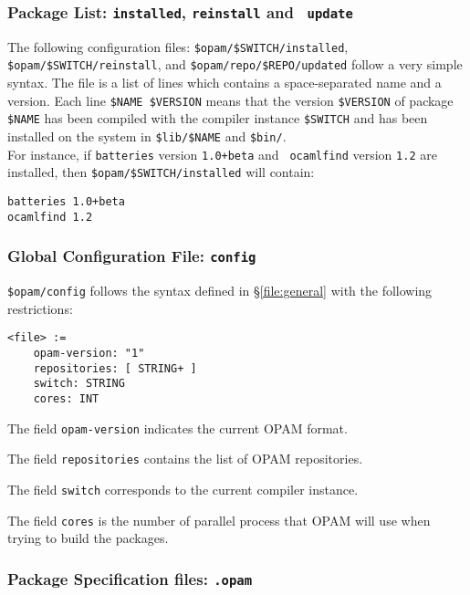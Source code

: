 \documentclass[a4paper,11pt]{article}
\begin{document}
\subsubsection{Package List: {\tt installed}, {\tt reinstall} and {\tt
  update}}
\label{file:installed}

The following configuration files: \verb+$opam/$SWITCH/installed+,
\verb+$opam/$SWITCH/reinstall+, and \verb+$opam/repo/$REPO/updated+
follow a very simple syntax. The file is a list of lines which
contains a space-separated name and a version. Each line
\verb+$NAME $VERSION+ means that the version \verb+$VERSION+ of
package \verb+$NAME+ has been compiled with the compiler instance
\verb+$SWITCH+ and has been installed on the system in
\verb+$lib/$NAME+ and \verb+$bin/+. \\

For instance, if {\tt batteries} version {\tt 1.0+beta} and {\tt
  ocamlfind} version {\tt 1.2} are installed, then
\verb+$opam/$SWITCH/installed+ will contain:

{\small
\begin{Verbatim}[frame=single]
batteries 1.0+beta
ocamlfind 1.2
\end{Verbatim}
}

\subsubsection{Global Configuration File: {\tt config}}
\label{file:config}

\verb+$opam/config+ follows the syntax defined in \S\ref{file:general} with
the following restrictions:

{\small
\begin{Verbatim}[frame=single]
<file> :=
    opam-version: "1"
    repositories: [ STRING+ ]
    switch: STRING
    cores: INT
\end{Verbatim}
}

The field {\tt opam-version} indicates the current OPAM format.

The field {\tt repositories} contains the list of OPAM repositories.

The field {\tt switch} corresponds to the current compiler instance.

The field {\tt cores} is the number of parallel process that OPAM will
use when trying to build the packages.

\subsubsection{Package Specification files: {\tt *.opam}}
\label{file:opam}
\end{document}
